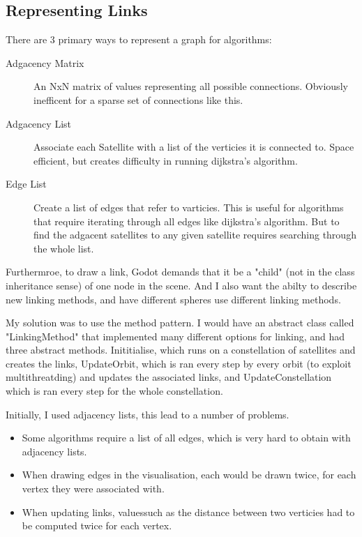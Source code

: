 \documentclass[12pt]{article}
\begin{document}
\subsection{Representing Links}

There are 3 primary ways to represent a graph for algorithms:

\begin{description}
\item[Adgacency Matrix] An NxN matrix of values representing all possible connections. Obviously inefficent for a sparse set of connections like this.
\item[Adgacency List] Associate each Satellite with a list of the verticies it is connected to. Space efficient, but creates difficulty in running dijkstra's algorithm.
\item[Edge List] Create a list of edges that refer to varticies. This is useful for algorithms that require iterating through all edges like dijkstra's algorithm. But to find the adgacent satellites to any given satellite requires searching through the whole list.
\end{description}

Furthermroe, to draw a link, Godot demands that it be a "child" (not in the class inheritance sense) of one node in the scene. And I also want the abilty to describe new linking methods, and have different spheres use different linking methods.

My solution was to use the method pattern. I would have an abstract class called "LinkingMethod" that implemented many different options for linking, and had three abstract methods. Inititialise, which runs on a constellation of satellites and creates the links, UpdateOrbit, which is ran every step by every orbit (to exploit multithreatding) and updates the associated links, and UpdateConstellation which is ran every step for the whole constellation.

Initially, I used adjacency lists, this lead to a number of problems.

\begin{itemize}
\item Some algorithms require a list of all edges, which is very hard to obtain with adjacency lists.
\item When drawing edges in the visualisation, each would be drawn twice, for each vertex they were associated with.
\item When updating links, valuessuch as the distance between two verticies had to be computed twice for each vertex.
\end{itemize}
\end{document}
